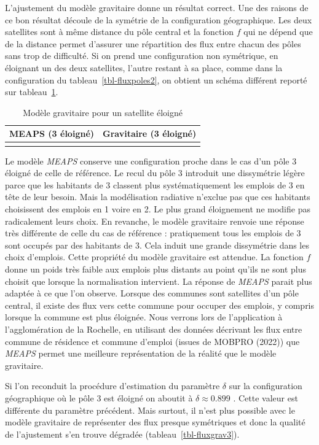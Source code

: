 \documentclass[
  10pt,
  a4paper,
  numbers=noendperiod,
  DIV=9]{scrreprt}
\begin{document}
L'ajustement du modèle gravitaire donne un résultat correct. Une des
raisons de ce bon résultat découle de la symétrie de la configuration
géographique. Les deux satellites sont à même distance du pôle central
et la fonction \(f\) qui ne dépend que de la distance permet d'assurer
une répartition des flux entre chacun des pôles sans trop de difficulté.
Si on prend une configuration non symétrique, en éloignant un des deux
satellites, l'autre restant à sa place, comme dans la configuration du
tableau~\ref{tbl-fluxpoles2}, on obtient un schéma différent reporté sur
tableau~\ref{tbl-fluxgrav2}.

\hypertarget{tbl-fluxgrav2}{}
\begin{longtable}{cc}
\caption{\label{tbl-fluxgrav2}Modèle gravitaire pour un satellite éloigné }\tabularnewline

\toprule
MEAPS (3 éloigné) & Gravitaire (3 éloigné) \\ 
\midrule
 &  \\ 
\bottomrule
\end{longtable}

Le modèle \emph{MEAPS} conserve une configuration proche dans le cas
d'un pôle 3 éloigné de celle de référence. Le recul du pôle 3 introduit
une dissymétrie légère parce que les habitants de 3 classent plus
systématiquement les emplois de 3 en tête de leur besoin. Mais la
modélisation radiative n'exclue pas que ces habitants choisissent des
emplois en 1 voire en 2. Le plus grand éloignement ne modifie pas
radicalement leurs choix. En revanche, le modèle gravitaire renvoie une
réponse très différente de celle du cas de référence : pratiquement tous
les emplois de 3 sont occupés par des habitants de 3. Cela induit une
grande dissymétrie dans les choix d'emplois. Cette propriété du modèle
gravitaire est attendue. La fonction \(f\) donne un poids très faible
aux emplois plus distants au point qu'ils ne sont plus choisit que
lorsque la normalisation intervient. La réponse de \emph{MEAPS} parait
plus adaptée à ce que l'on observe. Lorsque des communes sont satellites
d'un pôle central, il existe des flux vers cette commune pour occuper
des emplois, y compris lorsque la commune est plus éloignée. Nous
verrons lors de l'application à l'agglomération de la Rochelle, en
utilisant des données décrivant les flux entre commune de résidence et
commune d'emploi (issues de MOBPRO (2022)) que \emph{MEAPS} permet une
meilleure représentation de la réalité que le modèle gravitaire.

Si l'on reconduit la procédure d'estimation du paramètre \(\delta\) sur
la configuration géographique où le pôle 3 est éloigné on aboutit à
\(\delta \approx 0.899\) . Cette valeur est différente du paramètre
précédent. Mais surtout, il n'est plus possible avec le modèle
gravitaire de représenter des flux presque symétriques et donc la
qualité de l'ajustement s'en trouve dégradée
(tableau~\ref{tbl-fluxgrav3}).
\end{document}
